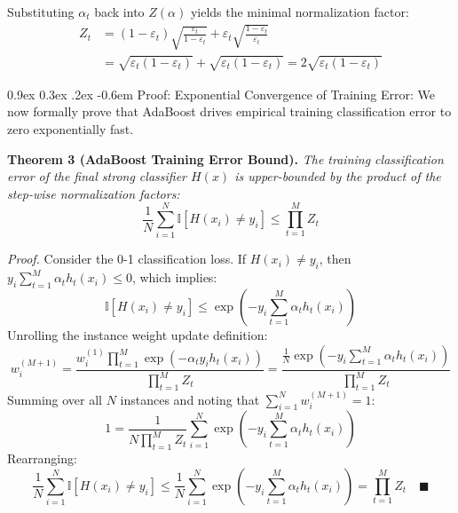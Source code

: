 \documentclass[11pt,a4paper]{article}
\makeatletter
\renewcommand\paragraph{\@startsection{paragraph}{4}{\z@}%
                                     {0.9ex \@plus0.3ex \@minus.2ex}%
                                     {-0.6em}%
                                     {\normalfont\normalsize\bfseries}}
\makeatother
\begin{document}
Substituting $\alpha_t$ back into $Z(\alpha)$ yields the minimal normalization factor:
\begin{align}
    Z_t &= (1 - \varepsilon_t) \sqrt{\frac{\varepsilon_t}{1 - \varepsilon_t}} + \varepsilon_t \sqrt{\frac{1 - \varepsilon_t}{\varepsilon_t}} \nonumber \\
    &= \sqrt{\varepsilon_t (1 - \varepsilon_t)} + \sqrt{\varepsilon_t (1 - \varepsilon_t)} = 2\sqrt{\varepsilon_t (1 - \varepsilon_t)}
\end{align}

\paragraph{Proof: Exponential Convergence of Training Error:}
We now formally prove that AdaBoost drives empirical training classification error to zero exponentially fast.

\textbf{Theorem 3 (AdaBoost Training Error Bound).} \emph{The training classification error of the final strong classifier $H(x)$ is upper-bounded by the product of the step-wise normalization factors:}
\begin{equation}
    \frac{1}{N} \sum_{i=1}^N \mathbb{I}[H(x_i) \ne y_i] \le \prod_{t=1}^M Z_t
\end{equation}

\emph{Proof.} Consider the 0-1 classification loss. If $H(x_i) \ne y_i$, then $y_i \sum_{t=1}^M \alpha_t h_t(x_i) \le 0$, which implies:
\begin{equation}
    \mathbb{I}[H(x_i) \ne y_i] \le \exp\left( -y_i \sum_{t=1}^M \alpha_t h_t(x_i) \right)
\end{equation}
Unrolling the instance weight update definition:
\begin{equation}
    w_i^{(M+1)} = \frac{w_i^{(1)} \prod_{t=1}^M \exp(-\alpha_t y_i h_t(x_i))}{\prod_{t=1}^M Z_t} = \frac{\frac{1}{N} \exp\left( -y_i \sum_{t=1}^M \alpha_t h_t(x_i) \right)}{\prod_{t=1}^M Z_t}
\end{equation}
Summing over all $N$ instances and noting that $\sum_{i=1}^N w_i^{(M+1)} = 1$:
\begin{equation}
    1 = \frac{1}{N \prod_{t=1}^M Z_t} \sum_{i=1}^N \exp\left( -y_i \sum_{t=1}^M \alpha_t h_t(x_i) \right)
\end{equation}
Rearranging:
\begin{equation}
    \frac{1}{N} \sum_{i=1}^N \mathbb{I}[H(x_i) \ne y_i] \le \frac{1}{N} \sum_{i=1}^N \exp\left( -y_i \sum_{t=1}^M \alpha_t h_t(x_i) \right) = \prod_{t=1}^M Z_t \quad \blacksquare
\end{equation}
\end{document}
